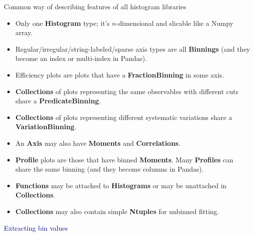 \documentclass[aspectratio=169]{beamer}
\begin{document}
\begin{frame}{Common way of describing features of all histogram libraries}
\vspace{0.5 cm}
\begin{itemize}
\item Only one {\bf Histogram} type; it's $n$-dimensional and slicable like a Numpy array.
\item Regular/irregular/string-labeled/sparse axis types are all {\bf Binnings} (and they become an index or multi-index in Pandas).
\item Efficiency plots are plots that have a {\bf FractionBinning} in some axis.
\item {\bf Collections} of plots representing the same observables with different cuts share a {\bf PredicateBinning}.
\item {\bf Collections} of plots representing different systematic variations share a {\bf VariationBinning}.
\item An {\bf Axis} may also have {\bf Moments} and {\bf Correlations}.
\item {\bf Profile} plots are those that have binned {\bf Moments}. Many {\bf Profiles} can share the same binning (and they become columns in Pandas).
\item {\bf Functions} may be attached to {\bf Histograms} or may be unattached in {\bf Collections}.
\item {\bf Collections} may also contain simple {\bf Ntuples} for unbinned fitting.
\end{itemize}
\end{frame}

\begin{frame}{}
\LARGE
\begin{center}
\textcolor{darkblue}{Extracting bin values}
\end{center}
\end{frame}
\end{document}
